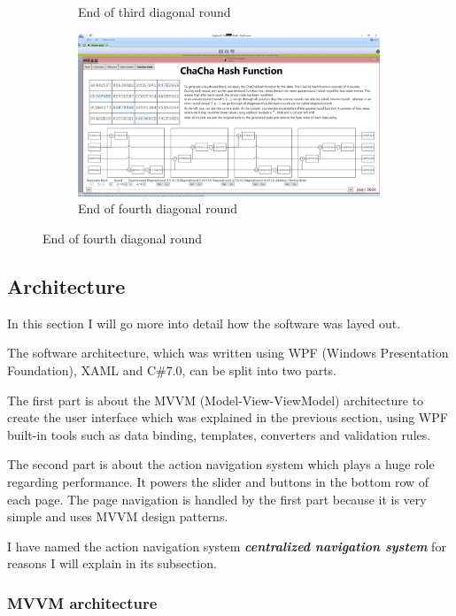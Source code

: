 \begin{figure}
\begin{subfigure}{0.5\textwidth}
  \caption{End of third diagonal round}
  \label{fig:chachahash.dr.3}
\end{subfigure}%
\begin{subfigure}{0.5\textwidth}
  \centering
  \includegraphics[width=0.99\textwidth]{figures/ct2/chachahash/chachahash-dr4-end.png}
  \caption{End of fourth diagonal round}
  \label{fig:chachahash.dr.4}
\end{subfigure}
\end{figure}

\subsection{Architecture}
\label{sec:Architecture}

In this section I will go more into detail how the software was layed out.

The software architecture, which was written using WPF (Windows Presentation Foundation), XAML and C\#7.0, can be split into two parts.

The first part is about the MVVM (Model-View-ViewModel) architecture to create the user interface which was explained in the previous section, using WPF built-in tools such as data binding, templates, converters and validation rules.

The second part is about the action navigation system which plays a huge role regarding performance. It powers the slider and buttons in the bottom row of each page. The page navigation is handled by the first part because it is very simple and uses MVVM design patterns.

I have named the action navigation system \textit{\textbf{centralized navigation system}} for reasons I will explain in its subsection.

\subsubsection{MVVM architecture}

